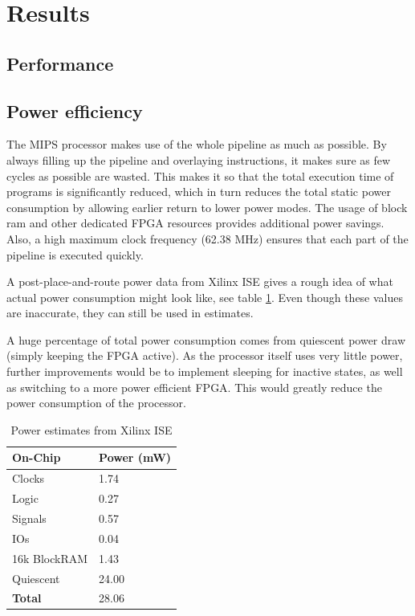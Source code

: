 \section{Results}

\subsection{Performance}

\subsection{Power efficiency}

The MIPS processor makes use of the whole pipeline as much as possible.
By always filling up the pipeline and overlaying instructions, it makes sure as few cycles as possible are wasted.
This makes it so that the total execution time of programs is significantly reduced, which in turn reduces the total static power consumption by allowing earlier return to lower power modes.
The usage of block ram and other dedicated FPGA resources provides additional power savings.
Also, a high maximum clock frequency (62.38 MHz) ensures that each part of the pipeline is executed quickly.

A post-place-and-route power data from Xilinx ISE gives a rough idea of what actual power consumption might look like, see table \ref{tab:power_consumption}.
Even though these values are inaccurate, they can still be used in estimates.

A huge percentage of total power consumption comes from quiescent power draw (simply keeping the FPGA active).
As the processor itself uses very little power, further improvements would be to implement sleeping for inactive states, as well as switching to a more power efficient FPGA.
This would greatly reduce the power consumption of the processor.

\begin{table}[h]
    \centering
    \begin{tabular}{|l|l|}
        \hline
        \textbf{On-Chip} & \textbf{Power (mW)} \\ \hline
        Clocks           & 1.74                \\ \hline
        Logic            & 0.27                \\ \hline
        Signals          & 0.57                \\ \hline
        IOs              & 0.04                \\ \hline
        16k BlockRAM     & 1.43                \\ \hline
        Quiescent        & 24.00               \\ \hline
        \textbf{Total}   & 28.06               \\ \hline
    \end{tabular}
    \caption{Power estimates from Xilinx ISE}
    \label{tab:power_consumption}
\end{table}
